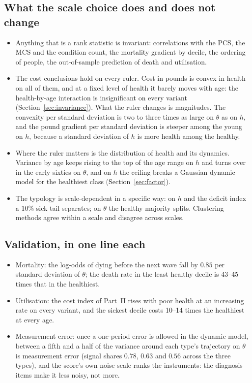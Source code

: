 \documentclass[11pt]{article}
\begin{document}
\subsection{What the scale choice does and does not change}
\begin{itemize}
\item Anything that is a rank statistic is invariant: correlations with the PCS, the MCS and the condition count, the mortality gradient by decile, the ordering of people, the out-of-sample prediction of death and utilisation.
\item The cost conclusions hold on every ruler. Cost in pounds is convex in health on all of them, and at a fixed level of health it barely moves with age: the health-by-age interaction is insignificant on every variant (Section~\ref{sec:invariance}). What the ruler changes is magnitudes. The convexity per standard deviation is two to three times as large on $\theta$ as on $h$, and the pound gradient per standard deviation is steeper among the young on $h$, because a standard deviation of $h$ is more health among the healthy.
\item Where the ruler matters is the distribution of health and its dynamics. Variance by age keeps rising to the top of the age range on $h$ and turns over in the early sixties on $\theta$, and on $h$ the ceiling breaks a Gaussian dynamic model for the healthiest class (Section~\ref{sec:factor}).
\item The typology is scale-dependent in a specific way: on $h$ and the deficit index a 10\% sick tail separates; on $\theta$ the healthy majority splits. Clustering methods agree within a scale and disagree across scales.
\end{itemize}

\subsection{Validation, in one line each}
\begin{itemize}
\item Mortality: the log-odds of dying before the next wave fall by $0.85$ per standard deviation of $\theta$; the death rate in the least healthy decile is 43--45 times that in the healthiest.
\item Utilisation: the cost index of Part~II rises with poor health at an increasing rate on every variant, and the sickest decile costs 10--14 times the healthiest at every age.
\item Measurement error: once a one-period error is allowed in the dynamic model, between a fifth and a half of the variance around each type's trajectory on $\theta$ is measurement error (signal shares $0.78$, $0.63$ and $0.56$ across the three types), and the score's own noise scale ranks the instruments: the diagnosis items make it less noisy, not more.
\end{itemize}
\end{document}
